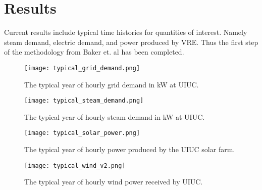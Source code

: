 \section{Results}

Current results include typical time histories for quantities of interest. Namely steam demand, electric demand, and power produced by VRE. Thus the first step of the methodology from Baker et. al has been completed.

\begin{figure}[H]
 	\centering
 	\label{grid-demand}
 	\texttt{[image: typical\_grid\_demand.png]}
 	\caption{The typical year of hourly grid demand in kW at UIUC.}
\end{figure} 
\begin{figure}[H]
	\centering
	\label{steam-demand}
	\texttt{[image: typical\_steam\_demand.png]}
	\caption{The typical year of hourly steam demand in kW at UIUC.}
\end{figure}
\begin{figure}[H]
	\centering
	\label{solar-power}
	\texttt{[image: typical\_solar\_power.png]}
	\caption{The typical year of hourly power produced by the UIUC solar farm.}
\end{figure}
\begin{figure}[H]
	\centering
	\label{wind-power}
	\texttt{[image: typical\_wind\_v2.png]}
	\caption{The typical year of hourly wind power received by UIUC.}
\end{figure}